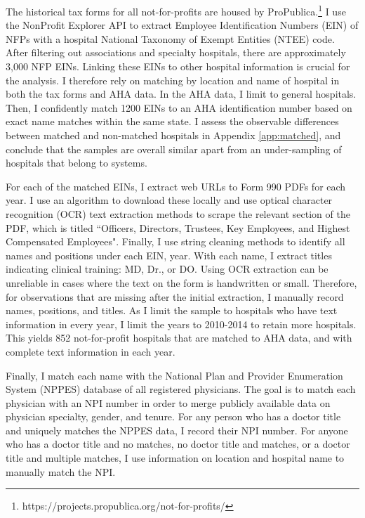 \documentclass[12pt]{article}
\begin{document}
    The historical tax forms for all not-for-profits are housed by ProPublica.\footnote{https://projects.propublica.org/not-for-profits/} I use the NonProfit Explorer API to extract Employee Identification Numbers (EIN) of NFPs with a hospital National Taxonomy of Exempt Entities (NTEE) code. After filtering out associations and specialty hospitals, there are approximately 3,000 NFP EINs. Linking these EINs to other hospital information is crucial for the analysis. I therefore rely on matching by location and name of hospital in both the tax forms and AHA data. In the AHA data, I limit to general hospitals. Then, I confidently match 1200 EINs to an AHA identification number based on exact name matches within the same state. I assess the observable differences between matched and non-matched hospitals in Appendix \ref{app:matched}, and conclude that the samples are overall similar apart from an under-sampling of hospitals that belong to systems.
    
    For each of the matched EINs, I extract web URLs to Form 990 PDFs for each year. I use an algorithm to download these locally and use optical character recognition (OCR) text extraction methods to scrape the relevant section of the PDF, which is titled ``Officers, Directors, Trustees, Key Employees, and Highest Compensated Employees". Finally, I use string cleaning methods to identify all names and positions under each EIN, year. With each name, I extract titles indicating clinical training: MD, Dr., or DO. Using OCR extraction can be unreliable in cases where the text on the form is handwritten or small. Therefore, for observations that are missing after the initial extraction, I manually record names, positions, and titles. As I limit the sample to hospitals who have text information in every year, I limit the years to 2010-2014 to retain more hospitals. This yields 852 not-for-profit hospitals that are matched to AHA data, and with complete text information in each year. 

    Finally, I match each name with the National Plan and Provider Enumeration System (NPPES) database of all registered physicians. The goal is to match each physician with an NPI number in order to merge publicly available data on physician specialty, gender, and tenure. For any person who has a doctor title and uniquely matches the NPPES data, I record their NPI number. For anyone who has a doctor title and no matches, no doctor title and matches, or a doctor title and multiple matches, I use information on location and hospital name to manually match the NPI. 
\end{document}
